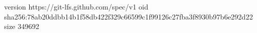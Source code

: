 version https://git-lfs.github.com/spec/v1
oid sha256:78ab20ddbb14b1f58db422f329c66599c1f99126c27fba3f8930b97b6e292d22
size 349692
